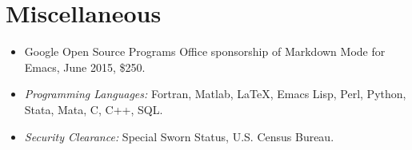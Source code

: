 \documentclass[10pt,letterpaper]{article}
\begin{document}
\section*{Miscellaneous}

\begin{itemize}
\item Google Open Source Programs Office sponsorship of Markdown Mode for Emacs, June 2015, \$250.
\item \textit{Programming Languages:} Fortran, Matlab, \LaTeX, Emacs Lisp, Perl, Python, Stata, Mata, C, C++, SQL.
\item \textit{Security Clearance:} Special Sworn Status, U.S. Census Bureau.
\end{itemize}
\end{document}
